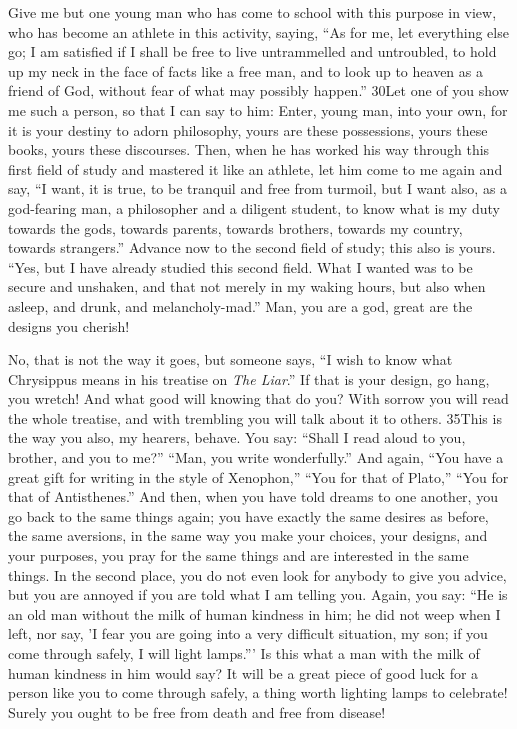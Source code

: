Give me but one young man who has come to school with this purpose in view, who has become an athlete in this activity, saying, ``As for me, let everything else go; I am satisfied if I shall be free to live untrammelled and untroubled, to hold up my neck in the face of facts like a free man, and to look up to heaven as a friend of God, without fear of what may possibly happen.'' 30Let one of you show me such a person, so that I can say to him: Enter, young man, into your own, for it is your destiny to adorn philosophy, yours are these possessions, yours these books, yours these discourses. Then, when he has worked his way through this first field of study and mastered it like an athlete, let him come to me again and say, ``I want, it is true, to be tranquil and free from turmoil, but I want also, as a god-fearing man, a philosopher and a diligent student, to know what is my duty towards the gods, towards parents, towards brothers, towards my country, towards strangers.'' Advance now to the second field of study; this also is yours. ``Yes, but I have already studied this second field. What I wanted was to be secure and unshaken, and that not merely in my waking hours, but also when asleep, and drunk, and melancholy-mad.'' Man, you are a god, great are the designs you cherish!

No, that is not the way it goes, but someone says, ``I wish to know what Chrysippus means in his treatise on \emph{The Liar}.'' If that is your design, go hang, you wretch! And what good will knowing that do you? With sorrow you will read the whole treatise, and with trembling you will talk about it to others. 35This is the way you also, my hearers, behave. You say: ``Shall I read aloud to you, brother, and you to me?'' ``Man, you write wonderfully.'' And again, ``You have a great gift for writing in the style of Xenophon,'' ``You for that of Plato,'' ``You for that of Antisthenes.'' And then, when you have told dreams to one another, you go back to the same things again; you have exactly the same desires as before, the same aversions, in the same way you make your choices, your designs, and your purposes, you pray for the same things and are interested in the same things. In the second place, you do not even look for anybody to give you advice, but you are annoyed if you are told what I am telling you. Again, you say: ``He is an old man without the milk of human kindness in him; he did not weep when I left, nor say, 'I fear you are going into a very difficult situation, my son; if you come through safely, I will light lamps.''' Is this what a man with the milk of human kindness in him would say? It will be a great piece of good luck for a person like you to come through safely, a thing worth lighting lamps to celebrate! Surely you ought to be free from death and free from disease!


